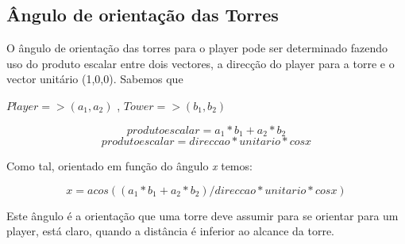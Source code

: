 \subsection{Ângulo de orientação das Torres}

O ângulo de orientação das torres para o player pode ser determinado fazendo uso do produto escalar entre dois vectores, a direcção do player para a torre e o vector unitário (1,0,0). Sabemos que

\-
\begin{center}
\begin{math}
Player => (a_1,a_2)
\end{math}
,
\begin{math}
Tower => (b_1,b_2)
\end{math}

\begin{equation}
produto escalar = a_1*b_1 + a_2*b_2
\end{equation}
\begin{equation}
produto escalar = direccao * unitario * cos x
\end{equation}
\end{center}

Como tal, orientado em função do ângulo \emph{x} temos:

\begin{equation}
x = acos( (a_1*b_1 + a_2*b_2 ) / direccao * unitario * cos x )
\end{equation}


Este ângulo é a orientação que uma torre deve assumir para se orientar para um player, está claro, quando a distância é inferior ao alcance da torre.




